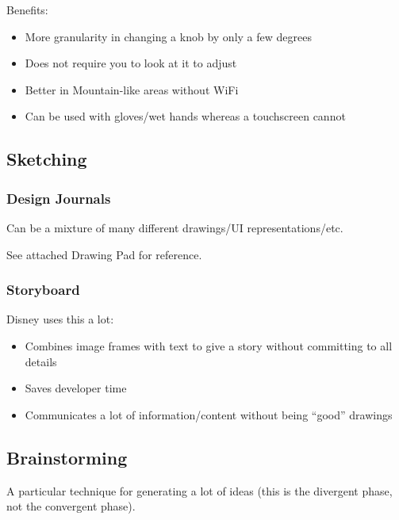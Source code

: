 Benefits:
\begin{itemize}
    \item More granularity in changing a knob by only a few degrees
    \item Does not require you to look at it to adjust
    \item Better in Mountain-like areas without WiFi
    \item Can be used with gloves/wet hands whereas a touchscreen cannot
\end{itemize}

\subsection{Sketching}
\subsubsection{Design Journals}
Can be a mixture of many different drawings/UI representations/etc.

See attached Drawing Pad for reference.

\subsubsection{Storyboard}
Disney uses this a lot:
\begin{itemize}
    \item Combines image frames with text to give a story without committing to all details
    \item Saves developer time
    \item Communicates a lot of information/content without being ``good'' drawings
\end{itemize}

\subsection{Brainstorming}
A particular technique for generating a lot of ideas (this is the divergent phase, not the convergent phase).


